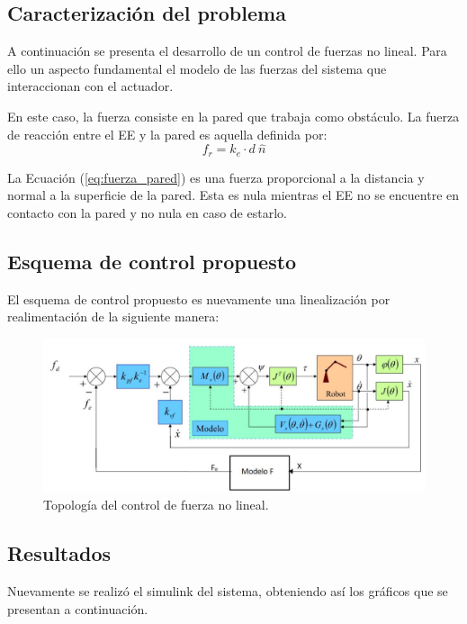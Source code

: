 %

%

\subsection{Caracterización del problema}
A continuación se presenta el desarrollo de un control de fuerzas no lineal. Para ello un aspecto fundamental el modelo de las fuerzas del sistema que interaccionan con el actuador.

En este caso, la fuerza consiste en la pared que trabaja como obstáculo. La fuerza de reacción entre el EE y la pared es aquella definida por:
\begin{equation}
f_r = k_e \cdot d \ \hat{n}
\label{eq:fuerza_pared}
\end{equation}

La Ecuación (\ref{eq:fuerza_pared}) es una fuerza proporcional a la distancia y normal a la superficie de la pared. Esta es nula mientras el EE no se encuentre en contacto con la pared y no nula en caso de estarlo.

\subsection{Esquema de control propuesto}
El esquema de control propuesto es nuevamente una linealización por realimentación de la siguiente manera:

\begin{figure}[H]
	\centering
	\includegraphics[width=0.8\linewidth]{ImagenesControl de fuerza no lineal/controlf}
	\caption{Topología del control de fuerza no lineal.}	
	\label{fig:control_f_modelo}
\end{figure}


\subsection{Resultados}
Nuevamente se realizó el simulink del sistema, obteniendo así los gráficos que se presentan a continuación.

